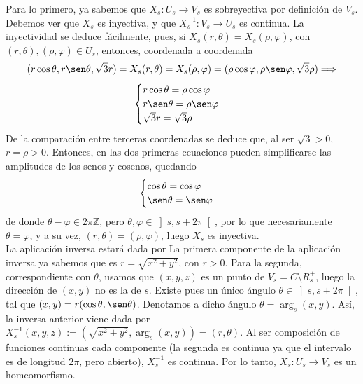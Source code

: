 \documentclass[12pt]{article}
\newcommand{\Z}{\mathbb{Z}}
\begin{document}
\begin{ejercicio}
\begin{enumerate}
            Para lo primero, ya sabemos que $X_s : U_s \to V_s$ es sobreyectiva por definición de $V_s$. Debemos ver que $X_s$ es inyectiva, y que 
            $X_s^{-1} : V_s \to U_s$ es continua. La inyectividad se deduce fácilmente, pues, si $X_s(r, \theta) = X_s(\rho, \varphi)$, 
            con $(r, \theta), (\rho, \varphi) \in U_s$, entonces, coordenada
            a coordenada
            $$(r \cos \theta, r \sen \theta, \sqrt{3}r) = X_s(r, \theta) = X_s(\rho, \varphi) = (\rho \cos \varphi, \rho \sen \varphi, \sqrt{3}\rho) 
            \Longrightarrow$$
            $$\begin{cases}
                r \cos \theta = \rho \cos \varphi \\
                r \sen \theta = \rho \sen \varphi \\
                \sqrt{3}r = \sqrt{3}\rho
            \end{cases}$$
            De la comparación entre terceras coordenadas se deduce que, al ser $\sqrt{3} > 0$, $r = \rho > 0$. Entonces, en las dos primeras ecuaciones pueden
            simplificarse las amplitudes de los senos y cosenos, quedando
            $$\begin{cases}
                \cos \theta = \cos \varphi \\
                \sen \theta = \sen \varphi
            \end{cases}$$
            de donde $\theta - \varphi \in 2 \pi \Z$, pero $\theta, \varphi \in \left]s , s + 2 \pi \right[$, por lo que 
            necesariamente $\theta = \varphi$, y a su vez, $(r, \theta) = (\rho, \varphi)$, luego $X_s$ es inyectiva. \\

            La aplicación inversa estará dada por 
            La primera componente de la aplicación inversa ya sabemos que es $r = \sqrt{x^2 + y^2}$, con $r > 0$. Para la segunda, correspondiente con 
            $\theta$, usamos que $(x,y,z)$ es un punto de $V_s = C \setminus R_s^{+}$, luego la dirección de $(x,y)$ no es la de $s$. Existe pues un único
            ángulo $\theta \in \left]s, s + 2 \pi \right[$, tal que $(x,y) = r(\cos \theta, \sen \theta)$. Denotamos a dicho ángulo $\theta = \arg_s(x,y)$.
            Así, la inversa anterior viene dada por $X_s^{-1}(x,y,z) := (\sqrt{x^2 + y^2}, \arg_s(x,y)) = (r, \theta)$. Al ser composición de 
            funciones continuas cada componente (la segunda es continua ya que el intervalo es de longitud $2\pi$, pero abierto), $X^{-1}_s$ es continua.
            Por lo tanto, $X_s : U_s \to V_s$ es un homeomorfismo.


\end{enumerate}
\end{ejercicio}
\end{document}
